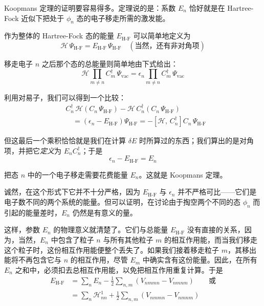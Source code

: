 Koopmans 定理的证明要容易得多。定理说的是：系数 $E_n$ 恰好就是在 Hartree-Fock 近似下把处于 $\phi_n$ 态的电子移走所需的激发能。

作为整体的 Hartree-Fock 态的能量 $E_{\text{H-F}}$ 可以简单地定义为
\begin{equation*}
\mathcal{H}\,\Psi_{\text{H-F}} = E_{\text{H-F}}\,\Psi_{\text{H-F}}\quad(\text{当然，还有非对角项})
\end{equation*}

移走电子 $n$ 之后那个态的总能量则简单地由下式给出：
\begin{equation*}
\mathcal{H} \prod_{m\neq n} C_m^{\dagger}\,\Psi_{\mathrm{vac}} = \epsilon_n \prod_{m\neq n} C_m^{\dagger}\,\Psi_{\mathrm{vac}}
\end{equation*}

利用对易子，我们可以得到一个比较：
\begin{align*}
&C_n^{\dagger}\,\mathcal{H}\left(C_n\,\Psi_{\text{H-F}}\right) - \mathcal{H}\,C_n^{\dagger}\left(C_n\,\Psi_{\text{H-F}}\right)\\
&\quad= \left(\epsilon_n - E_{\text{H-F}}\right)\Psi_{\text{H-F}} = -\left[\mathcal{H},\, C_n^{\dagger}\right] C_n\,\Psi_{\text{H-F}}
\end{align*}

但这最后一个乘积恰恰就是我们在计算 $\delta E$ 时所算过的东西；我们算出的是对角项，并把它\emph{定义}为 $E_n C_n^{\dagger}$；于是
\begin{equation*}
\epsilon_n - E_{\text{H-F}} = E_n
\end{equation*}

把态 $n$ 中的一个电子移走需要花费能量 $E_n$。这就是 Koopmans 定理。

诚然，在这个形式下它并不十分严格，因为 $E_{\text{H-F}}$ 与 $\epsilon_n$ 并不严格可比——它们是电子数不同的两个系统的能量。但可以证明，在讨论由于掏空两个不同的态 $\phi_n$ 而引起的能量差时，$E_n$ 仍然是有意义的量。

这样，参数 $E_n$ 的物理意义就清楚了。它们与总能量 $E_{\text{H-F}}$ 没有直接的关系，因为，当然，$E_n$ 中包含了粒子 $n$ 与所有其他粒子 $m$ 的相互作用能，而当我们移走这个粒子时，这份相互作用能便整个丢失了。如果我们接着移走粒子 $m$，其移出能将不再包含它与 $n$ 的相互作用，尽管 $E_m$ 中确实含有这份能量。因此，在所有 $E_n$ 之和中，必须扣去总相互作用能，以免把相互作用重复计算。于是
\begin{align*}
E_{\text{H-F}} &= \sum_n E_n - \frac{1}{2}\sum_{n,m}\left(V_{nmmn} - V_{nmnm}\right)\qquad\text{或}\\
&= \sum_n \mathcal{H}^1_{nn} + \frac{1}{2}\sum_{n,m}\left(V_{nmmn} - V_{nmnm}\right)
\end{align*}

